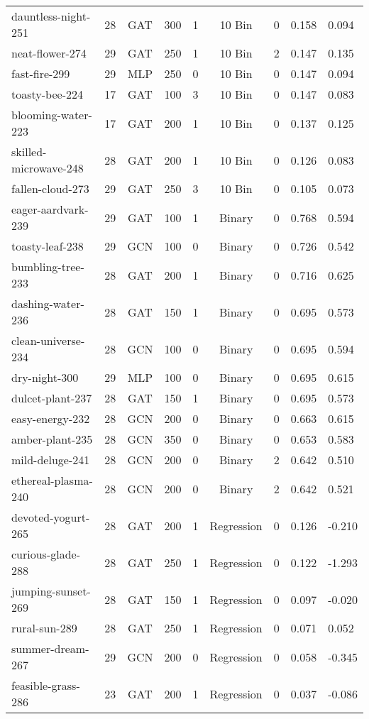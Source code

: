 \begin{table}
\begin{tabular}{lcccccc}
dauntless-night-251 & 28 & GAT & 300 & 1 & 10 Bin & 0 & 0.158 & 0.094 \\
neat-flower-274 & 29 & GAT & 250 & 1 & 10 Bin & 2 & 0.147 & 0.135 \\
fast-fire-299 & 29 & MLP & 250 & 0 & 10 Bin & 0 & 0.147 & 0.094 \\
toasty-bee-224 & 17 & GAT & 100 & 3 & 10 Bin & 0 & 0.147 & 0.083 \\
blooming-water-223 & 17 & GAT & 200 & 1 & 10 Bin & 0 & 0.137 & 0.125 \\
skilled-microwave-248 & 28 & GAT & 200 & 1 & 10 Bin & 0 & 0.126 & 0.083 \\
fallen-cloud-273 & 29 & GAT & 250 & 3 & 10 Bin & 0 & 0.105 & 0.073 \\
eager-aardvark-239 & 29 & GAT & 100 & 1 & Binary & 0 & 0.768 & 0.594 \\
toasty-leaf-238 & 29 & GCN & 100 & 0 & Binary & 0 & 0.726 & 0.542 \\
bumbling-tree-233 & 28 & GAT & 200 & 1 & Binary & 0 & 0.716 & 0.625 \\
dashing-water-236 & 28 & GAT & 150 & 1 & Binary & 0 & 0.695 & 0.573 \\
clean-universe-234 & 28 & GCN & 100 & 0 & Binary & 0 & 0.695 & 0.594 \\
dry-night-300 & 29 & MLP & 100 & 0 & Binary & 0 & 0.695 & 0.615 \\
dulcet-plant-237 & 28 & GAT & 150 & 1 & Binary & 0 & 0.695 & 0.573 \\
easy-energy-232 & 28 & GCN & 200 & 0 & Binary & 0 & 0.663 & 0.615 \\
amber-plant-235 & 28 & GCN & 350 & 0 & Binary & 0 & 0.653 & 0.583 \\
mild-deluge-241 & 28 & GCN & 200 & 0 & Binary & 2 & 0.642 & 0.510 \\
ethereal-plasma-240 & 28 & GCN & 200 & 0 & Binary & 2 & 0.642 & 0.521 \\
devoted-yogurt-265 & 28 & GAT & 200 & 1 & Regression & 0 & 0.126 & -0.210 \\
curious-glade-288 & 28 & GAT & 250 & 1 & Regression & 0 & 0.122 & -1.293 \\
jumping-sunset-269 & 28 & GAT & 150 & 1 & Regression & 0 & 0.097 & -0.020 \\
rural-sun-289 & 28 & GAT & 250 & 1 & Regression & 0 & 0.071 & 0.052 \\
summer-dream-267 & 29 & GCN & 200 & 0 & Regression & 0 & 0.058 & -0.345 \\
feasible-grass-286 & 23 & GAT & 200 & 1 & Regression & 0 & 0.037 & -0.086 \\

\end{tabular}
\end{table}
